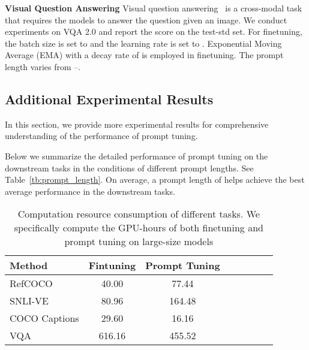 \documentclass[11pt]{article}
\begin{document}
\noindent \textbf{Visual Question Answering}  Visual question answering~\citep{vqa, vqav2} is a cross-modal task that requires the models to answer the question given an image. 
We conduct experiments on VQA 2.0 and report the score on the test-std set. 
For finetuning, the batch size is set to  and the learning rate is set to . Exponential Moving Average (EMA) with a decay rate of  is employed in finetuning. The prompt length varies from –.

\subsection{Additional Experimental Results}
\label{sec:appendix_results}
In this section, we provide more experimental results for comprehensive understanding of the performance of prompt tuning. 

Below we summarize the detailed performance of prompt tuning on the downstream tasks in the conditions of different prompt lengths. See Table~\ref{tb:prompt_length}. On average, a prompt length of  helps achieve the best average performance in the downstream tasks. 





\begin{table}[t]
\center
\small
\vskip 0.15in
\begin{adjustbox}{max width=1.0\textwidth}
\begin{tabular}{@{\extracolsep{\fill}}lccccccc}
\toprule
 
  Method
  & Fintuning & Prompt Tuning


  \\
\midrule
    RefCOCO 
    & 40.00   
& 77.44 
    \\
    
    SNLI-VE
    & 80.96  
& 164.48   
    \\
    
    COCO Captions
    & 29.60   
& 16.16   
    \\
    
    VQA
    & 616.16  
& 455.52  
    \\
\bottomrule
\end{tabular}
\end{adjustbox}
\caption{Computation resource consumption of different tasks. We specifically compute the GPU-hours of both finetuning and prompt tuning on large-size models}
\label{tb:computation}
\end{table}
 
\end{document}
